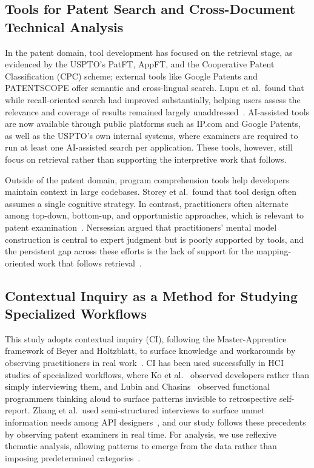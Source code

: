 \documentclass[sigconf]{acmart}
\begin{document}
\subsection{Tools for Patent Search and Cross-Document Technical Analysis}

In the patent domain, tool development has focused on the retrieval stage, as evidenced by the USPTO's PatFT, AppFT, and the Cooperative Patent Classification (CPC) scheme; external tools like Google Patents and PATENTSCOPE offer semantic and cross-lingual search. Lupu et al.\ found that while recall-oriented search had improved substantially, helping users assess the relevance and coverage of results remained largely unaddressed~\cite{Lupu2013}. AI-assisted tools are now available through public platforms such as IP.com and Google Patents, as well as the USPTO's own internal systems, where examiners are required to run at least one AI-assisted search per application. These tools, however, still focus on retrieval rather than supporting the interpretive work that follows.

Outside of the patent domain, program comprehension tools help developers maintain context in large codebases. Storey et al.\ found that tool design often assumes a single cognitive strategy. In contrast, practitioners often alternate among top-down, bottom-up, and opportunistic approaches, which is relevant to patent examination~\cite{Storey1999}. Nersessian argued that practitioners' mental model construction is central to expert judgment but is poorly supported by tools, and the persistent gap across these efforts is the lack of support for the mapping-oriented work that follows retrieval~\cite{Nersessian2008}.

\subsection{Contextual Inquiry as a Method for Studying Specialized Workflows}

This study adopts contextual inquiry (CI), following the Master-Apprentice framework of Beyer and Holtzblatt, to surface knowledge and workarounds by observing practitioners in real work~\cite{Beyer1997}. CI has been used successfully in HCI studies of specialized workflows, where Ko et al.~\cite{Ko2006} observed developers rather than simply interviewing them, and Lubin and Chasins~\cite{Lubin2021} observed functional programmers thinking aloud to surface patterns invisible to retrospective self-report. Zhang et al.\ used semi-structured interviews to surface unmet information needs among API designers~\cite{Zhang2020}, and our study follows these precedents by observing patent examiners in real time. For analysis, we use reflexive thematic analysis, allowing patterns to emerge from the data rather than imposing predetermined categories~\cite{Braun2006}.
\end{document}
